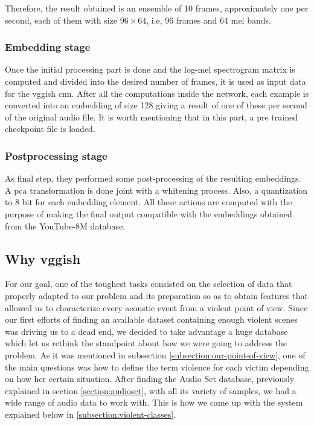 	Therefore, the result obtained is an ensemble of 10 frames, approximately one per second, each of them with size $96 \times 64$, i.e, 96 frames and 64 mel bands.
	
	\subsubsection*{Embedding stage}
	
	Once the initial processing part is done and the log-mel spectrogram matrix is computed and divided into the desired number of frames, it is used as input data for the \acrshort{vgg}ish \acrshort{cnn}. After all the computations inside the network, each example is converted into an embedding of size 128 giving a result of one of these per second of the original audio file. It is worth mentioning that in this part, a pre trained checkpoint file is loaded. 
	
	\subsubsection*{Postprocessing stage}
	
	As final step, they performed some post-processing of the resulting embeddings. A \acrfull{pca} transformation is done joint with a whitening process. Also, a quantization to 8 bit for each embedding element. All these actions are computed with the purpose of making the final output compatible with the embeddings obtained from the YouTube-8M database.
	
	
\subsection{Why \acrshort{vgg}ish}

	For our goal, one of the toughest tasks consisted on the selection of data that properly adapted to our problem and its preparation so as to obtain features that allowed us to characterize every acoustic event from a violent point of view. Since our first efforts of finding an available dataset containing enough violent scenes was driving us to a dead end, we decided to take advantage a huge database which let us rethink the standpoint about how we were going to address the problem. As it was mentioned in subsection \ref{subsection:our-point-of-view}, one of the main questions was how to define the term violence for each victim depending on how her certain situation. After finding the Audio Set database, previously explained in section \ref{section:audioset}, with all its variety of samples, we had a wide range of audio data to work with. This is how we came up with the system explained below in \ref{subsection:violent-classes}.
	

